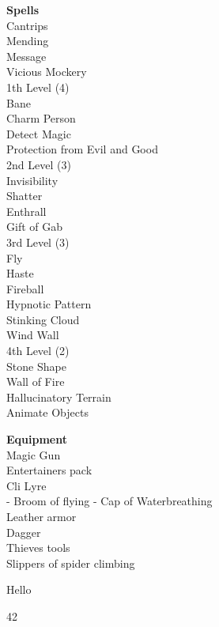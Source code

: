\documentclass[11pt]{article}
\begin{document}
\begin{minipage}[t]{.5\textwidth}
{\huge \textbf{\Fontauri Spells}}\\
\textcolor{OCRA}{Cantrips}\\
Mending\\
Message\\
Vicious Mockery\\
\textcolor{OCRA}{1th Level (4)}\\
Bane \\
Charm Person\\
Detect Magic\\
Protection from Evil and Good\\
\textcolor{OCRA}{2nd Level (3)}\\
Invisibility\\
Shatter\\
Enthrall\\
Gift of Gab\\
\textcolor{OCRA}{3rd Level (3)}\\
Fly\\
Haste\\
Fireball\\
Hypnotic Pattern\\
Stinking Cloud\\
Wind Wall\\
\textcolor{OCRA}{4th Level (2)}\\
Stone Shape\\
Wall of Fire\\
Hallucinatory Terrain\\
Animate Objects
\end{minipage}
\begin{minipage}[t]{.4\textwidth}\raggedleft
{\Large \textbf{ \Fontauri Equipment}}\\
Magic Gun \\
Entertainers pack\\
Cli Lyre\\ - Broom of flying - Cap of Waterbreathing\\
Leather armor \\
Dagger\\
Thieves tools\\
Slippers of spider climbing\\

\end{minipage}
\newpage
Hello
\begin{minipage}[t]{0.2\textwidth}
 42
\end{minipage}
\end{document}

